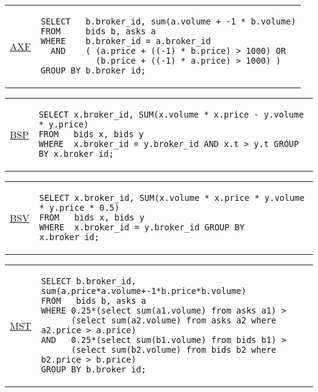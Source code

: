 \hspace{-5mm}\vspace{-8mm}
\begin{tabular}{lp{}}
\begin{rotate}{90}\hspace{-1cm}\underline{AXF}\end{rotate} &
{\scriptsize
\begin{verbatim}
SELECT   b.broker_id, sum(a.volume + -1 * b.volume)
FROM     bids b, asks a
WHERE    b.broker_id = a.broker_id
  AND    ( (a.price + ((-1) * b.price) > 1000) OR
           (b.price + ((-1) * a.price) > 1000) )
GROUP BY b.broker_id;
\end{verbatim}
}
\end{tabular}

\hspace{-5mm}\vspace{-8mm}
\begin{tabular}{lp{}}
\begin{rotate}{90}\hspace{-1cm}\underline{BSP}\end{rotate} &
{\scriptsize
\begin{verbatim}
SELECT x.broker_id, SUM(x.volume * x.price - y.volume * y.price)
FROM   bids x, bids y
WHERE  x.broker_id = y.broker_id AND x.t > y.t GROUP BY x.broker_id;
\end{verbatim}
}
\end{tabular}

\hspace{-5mm}\vspace{-8mm}
\begin{tabular}{lp{}}
\begin{rotate}{90}\hspace{-1cm}\underline{BSV}\end{rotate} &
{\scriptsize
\begin{verbatim}
SELECT x.broker_id, SUM(x.volume * x.price * y.volume * y.price * 0.5)
FROM   bids x, bids y
WHERE  x.broker_id = y.broker_id GROUP BY x.broker_id;
\end{verbatim}
}
\end{tabular}

\hspace{-5mm}\vspace{-8mm}
\begin{tabular}{lp{}}
\begin{rotate}{90}\hspace{-1cm}\underline{MST}\end{rotate} &
{\scriptsize
\begin{verbatim}
SELECT b.broker_id, sum(a.price*a.volume+-1*b.price*b.volume)
FROM   bids b, asks a
WHERE 0.25*(select sum(a1.volume) from asks a1) >
      (select sum(a2.volume) from asks a2 where a2.price > a.price)
AND   0.25*(select sum(b1.volume) from bids b1) >
      (select sum(b2.volume) from bids b2 where b2.price > b.price)
GROUP BY b.broker_id;
\end{verbatim}
}
\end{tabular}

